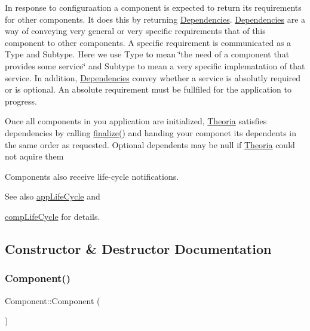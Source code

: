 In response to configuraation a component is expected to return its requirements for other components. It does this by returning \hyperlink{classtheoria_1_1core_1_1Dependencies}{Dependencies}. \hyperlink{classtheoria_1_1core_1_1Dependencies}{Dependencies} are a way of conveying very general or very specific requirements that of this component to other components. A specific requirement is communicated as a Type and Subtype. Here we use Type to mean \char`\"{}the need of a component that provides some service\char`\"{} and Subtype to mean a very specific implematation of that service. In addition, \hyperlink{classtheoria_1_1core_1_1Dependencies}{Dependencies} convey whether a service is absolutly required or is optional. An absolute requirement must be fullfiled for the application to progress.

Once all components in you application are initialized, \hyperlink{classtheoria_1_1core_1_1Theoria}{Theoria} satisfies dependencies by calling \hyperlink{classtheoria_1_1core_1_1Component_afd8acc89e2cd36e92bebe7e6fa530764}{finalize()} and handing your componet its dependents in the same order as requested. Optional dependents may be null if \hyperlink{classtheoria_1_1core_1_1Theoria}{Theoria} could not aquire them

Components also receive life-\/cycle notifications. \begin{DoxySeeAlso}{See also}
\hyperlink{classtheoria_1_1core_1_1Component_ae036cde9b803a621149efeff7e0e00fc}{app\+Life\+Cycle} and 

\hyperlink{classtheoria_1_1core_1_1Component_a92578e2b6253681a21b91e7c22b22975}{comp\+Life\+Cycle} for details. 
\end{DoxySeeAlso}


\subsection{Constructor \& Destructor Documentation}
\mbox{\label{classtheoria_1_1core_1_1Component_a8775db6d1a2c1afc2e77cd3c8f39da6f}} 
\subsubsection{\texorpdfstring{Component()}{Component()}\hspace{0.1cm}{\footnotesize\ttfamily [1/3]}}
{\footnotesize\ttfamily Component\+::\+Component (\begin{DoxyParamCaption}{ }\end{DoxyParamCaption})}

